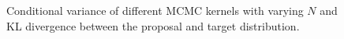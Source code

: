 \begin{figure}
  \centering
  \caption{Conditional variance of different MCMC kernels with varying \(N\) and KL divergence between the proposal and target distribution.
  }\label{fig:simulations}
  \vspace{-0.1in}
\end{figure}

